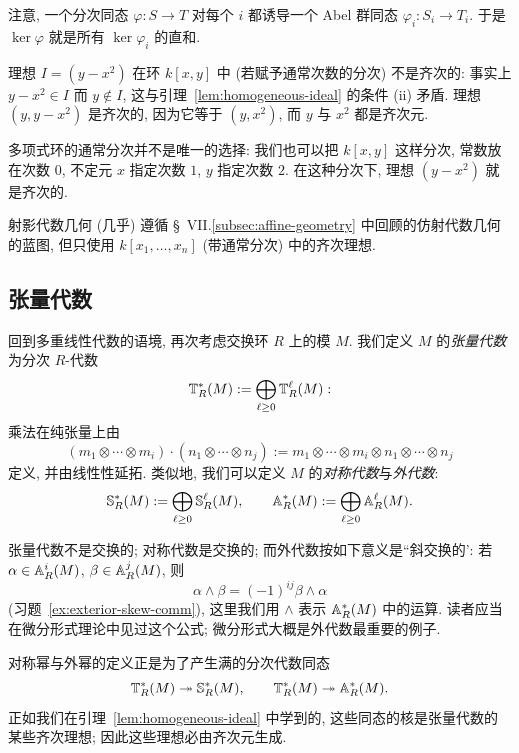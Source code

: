 注意, 一个分次同态 $\varphi:S\to T$ 对每个 $i$ 都诱导一个 Abel 群同态 $\varphi_i:S_i\to T_i$. 于是 $\ker\varphi$ 就是所有 $\ker\varphi_i$ 的直和.

\begin{example}\label{ex:homogeneous-ideal-example}
理想 $I=(y-x^2)$ 在环 $k[x,y]$ 中 (若赋予通常次数的分次) 不是齐次的: 事实上 $y-x^2\in I$ 而 $y\notin I$, 这与引理~\ref{lem:homogeneous-ideal} 的条件 (ii) 矛盾. 理想 $(y,y-x^2)$ 是齐次的, 因为它等于 $(y,x^2)$, 而 $y$ 与 $x^2$ 都是齐次元.

多项式环的通常分次并不是唯一的选择: 我们也可以把 $k[x,y]$ 这样分次, 常数放在次数 $0$, 不定元 $x$ 指定次数 $1$, $y$ 指定次数 $2$. 在这种分次下, 理想 $(y-x^2)$ 就是齐次的.
\end{example}

射影代数几何 (几乎) 遵循 \S~VII.\ref{subsec:affine-geometry} 中回顾的仿射代数几何的蓝图, 但只使用 $k[x_1,\dots,x_n]$ (带通常分次) 中的齐次理想.

\subsection{张量代数}
\label{subsec:tensor-algebras}

回到多重线性代数的语境, 再次考虑交换环 $R$ 上的模 $M$. 我们定义 $M$ 的\emph{张量代数}为分次 $R$-代数
\[
\mathbb{T}_R^*(M):=\bigoplus_{\ell\ge0}\mathbb{T}_R^\ell(M):
\]
乘法在纯张量上由
\[
(m_1\otimes\cdots\otimes m_i)\cdot(n_1\otimes\cdots\otimes n_j):=m_1\otimes\cdots\otimes m_i\otimes n_1\otimes\cdots\otimes n_j
\]
定义, 并由线性性延拓. 类似地, 我们可以定义 $M$ 的\emph{对称代数}与\emph{外代数}:
\[
\mathbb{S}_R^*(M):=\bigoplus_{\ell\ge0}\mathbb{S}_R^\ell(M),\qquad
\mathbb{A}_R^*(M):=\bigoplus_{\ell\ge0}\mathbb{A}_R^\ell(M).
\]

\begin{remark}\label{rmk:exterior-skew-comm}
张量代数不是交换的; 对称代数是交换的; 而外代数按如下意义是``斜交换的': 若 $\alpha\in\mathbb{A}_R^i(M)$, $\beta\in\mathbb{A}_R^j(M)$, 则
\[
\alpha\wedge\beta=(-1)^{ij}\beta\wedge\alpha
\]
(习题~\ref{ex:exterior-skew-comm}), 这里我们用 $\wedge$ 表示 $\mathbb{A}_R^*(M)$ 中的运算. 读者应当在微分形式理论中见过这个公式; 微分形式大概是外代数最重要的例子.
\end{remark}

对称幂与外幂的定义正是为了产生满的分次代数同态
\[
\mathbb{T}_R^*(M)\twoheadrightarrow\mathbb{S}_R^*(M),\qquad
\mathbb{T}_R^*(M)\twoheadrightarrow\mathbb{A}_R^*(M).
\]
正如我们在引理~\ref{lem:homogeneous-ideal} 中学到的, 这些同态的核是张量代数的某些齐次理想; 因此这些理想必由齐次元生成.

